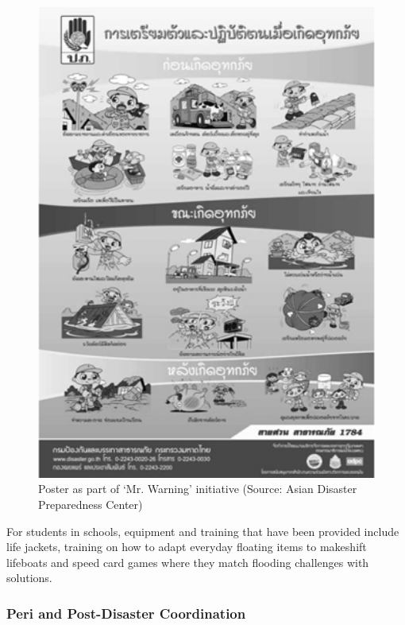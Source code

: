 \begin{figure}[htb]
	\centering
		\includegraphics[width=1.00\textwidth]{graphics/Disaster_Preparedness_Poster_Thailand.jpg}
	\caption{Poster as part of ‘Mr. Warning’ initiative (Source: Asian Disaster Preparedness Center)}
	\label{fig:Disaster_Preparedness_Poster_Thailand}
\end{figure}

For students in schools, equipment and training that have been provided include life jackets, training on how to adapt everyday floating items to makeshift lifeboats and speed card games where they match flooding challenges with solutions.

\subsubsection{Peri and Post-Disaster Coordination}

